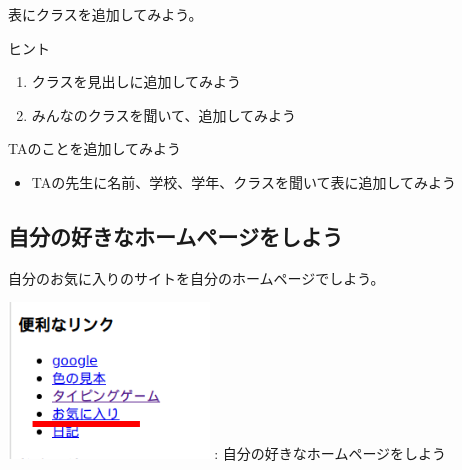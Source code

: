 \documentclass[a4paper,12pt]{jarticle}
\begin{document}
\bigskip

\bigskip

\bigskip

\theQuestion

表にクラスを追加してみよう。

ヒント

\begin{enumerate}
  \item クラスを見出しに追加してみよう
  \item
        みんなのクラスを聞いて、追加してみよう
\end{enumerate}
\theQuestion

TAのことを追加してみよう

\begin{itemize}
  \item
        TAの先生に名前、学校、学年、クラスを聞いて表に追加してみよう
\end{itemize}

\bigskip

\clearpage

\subsection{\theExercise 自分の好きなホームページをしよう}
\addtocounter{Exercise}{-1}\label{E:HTML_8}
自分のお気に入りのサイトを自分のホームページでしよう。



\centering
\begin{minipage}{\textwidth}
  {\upshape
    \centering
    \includegraphics[width=0.4\textwidth]{textbook-img193.png}
    \newline
    :
    自分の好きなホームページをしよう}
\end{minipage}



\bigskip
\end{document}

